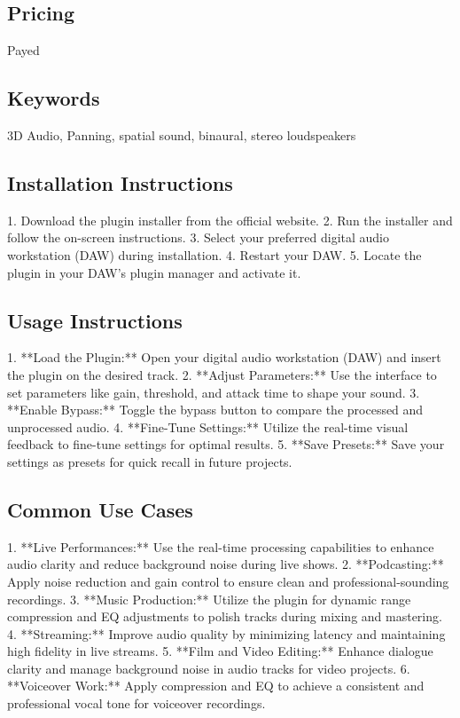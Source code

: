 \documentclass[8pt]{article}
\begin{document}
    \subsection*{Pricing}
    Payed

    \subsection*{Keywords}
    3D Audio, Panning, spatial sound, binaural, stereo loudspeakers

    \subsection*{Installation Instructions}
    1. Download the plugin installer from the official website.
2. Run the installer and follow the on-screen instructions.
3. Select your preferred digital audio workstation (DAW) during installation.
4. Restart your DAW.
5. Locate the plugin in your DAW’s plugin manager and activate it.

    \subsection*{Usage Instructions}
    1. **Load the Plugin:** Open your digital audio workstation (DAW) and insert the plugin on the desired track.
2. **Adjust Parameters:** Use the interface to set parameters like gain, threshold, and attack time to shape your sound.
3. **Enable Bypass:** Toggle the bypass button to compare the processed and unprocessed audio.
4. **Fine-Tune Settings:** Utilize the real-time visual feedback to fine-tune settings for optimal results.
5. **Save Presets:** Save your settings as presets for quick recall in future projects.

    \subsection*{Common Use Cases}
    1. **Live Performances:** Use the real-time processing capabilities to enhance audio clarity and reduce background noise during live shows.
2. **Podcasting:** Apply noise reduction and gain control to ensure clean and professional-sounding recordings.
3. **Music Production:** Utilize the plugin for dynamic range compression and EQ adjustments to polish tracks during mixing and mastering.
4. **Streaming:** Improve audio quality by minimizing latency and maintaining high fidelity in live streams.
5. **Film and Video Editing:** Enhance dialogue clarity and manage background noise in audio tracks for video projects.
6. **Voiceover Work:** Apply compression and EQ to achieve a consistent and professional vocal tone for voiceover recordings.
\end{document}
